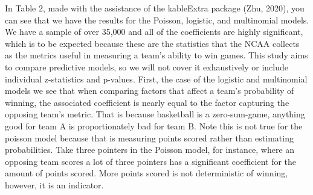 \documentclass[
  man,floatsintext]{apa6}
\begin{document}
In Table 2, made with the assistance of the kableExtra package (Zhu, 2020), you can see that we have the results for the Poisson, logistic, and multinomial models. We have a sample of over 35,000 and all of the coefficients are highly significant, which is to be expected because these are the statistics that the NCAA collects as the metrics useful in measuring a team's ability to win games. This study aims to compare predictive models, so we will not cover it exhaustively or include individual z-statistics and p-values. First, the case of the logistic and multinomial models we see that when comparing factors that affect a team's probability of winning, the associated coefficient is nearly equal to the factor capturing the opposing team's metric. That is because basketball is a zero-sum-game, anything good for team A is proportionately bad for team B. Note this is not true for the poisson model because that is measuring points scored rather than estimating probabilities. Take three pointers in the Poisson model, for instance, where an opposing team scores a lot of three pointers has a significant coefficient for the amount of points scored. More points scored is not deterministic of winning, however, it is an indicator.
\end{document}
